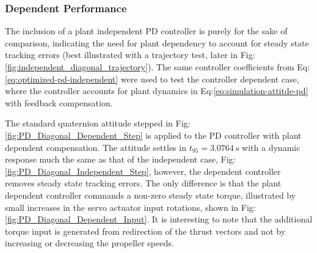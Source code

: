 \subsubsection{Dependent Performance}
\label{subsubsec:simulation.atttiude.pd.dependent}
The inclusion of a plant independent PD controller is purely for the sake of comparison, indicating the need for plant dependency to account for steady state tracking errors (best illustrated with a trajectory test, later in Fig:\ref{fig:independent_diagonal_trajectory}). The same controller coefficients from Eq:\ref{eq:optimized-pd-independent} were used to test the controller dependent case, where the controller accounts for plant dynamics in Eq:\ref{eq:simulation-attitde-pd} with feedback compensation.
\par
The standard quaternion attitude stepped in Fig:\ref{fig:PD_Diagonal_Dependent_Step} is applied to the PD controller with plant dependent compensation. The attitude settles in $t_{95}=3.0764~\text{s}$ with a dynamic response much the same as that of the independent case, Fig:\ref{fig:PD_Diagonal_Independent_Step}, however, the dependent controller removes steady state tracking errors. The only difference is that the plant dependent controller commands a non-zero steady state torque, illustrated by small increases in the servo actuator input rotations, shown in Fig:\ref{fig:PD_Diagonal_Dependent_Input}. It is interesting to note that the additional torque input is generated from redirection of the thrust vectors and not by increasing or decreasing the propeller speeds.
\par
